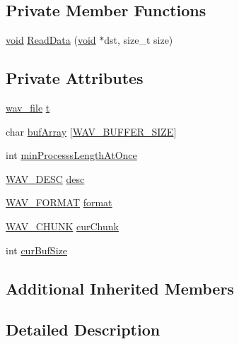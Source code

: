 \subsection*{Private Member Functions}
\begin{DoxyCompactItemize}
\item 
\mbox{\hyperlink{_thread_8h_af1e856da2e658414cb2456cb6f7ebc66}{void}} \mbox{\hyperlink{classnjli_1_1_wrapper_wav_a8e5df03af7dc8f841c9e316caa00a13d}{Read\+Data}} (\mbox{\hyperlink{_thread_8h_af1e856da2e658414cb2456cb6f7ebc66}{void}} $\ast$dst, size\+\_\+t size)
\end{DoxyCompactItemize}
\subsection*{Private Attributes}
\begin{DoxyCompactItemize}
\item 
\mbox{\hyperlink{structwav__file}{wav\+\_\+file}} \mbox{\hyperlink{classnjli_1_1_wrapper_wav_ad32ca04f4229e8b702a427dca72b9957}{t}}
\item 
char \mbox{\hyperlink{classnjli_1_1_wrapper_wav_a9b66f4b65280f952349f526c7012e9b8}{buf\+Array}} \mbox{[}\mbox{\hyperlink{_wrapper___w_a_v_8h_a9a6da6d572cf36f4c8df9df32f289291}{W\+A\+V\+\_\+\+B\+U\+F\+F\+E\+R\+\_\+\+S\+I\+ZE}}\mbox{]}
\item 
int \mbox{\hyperlink{classnjli_1_1_wrapper_wav_a89b4f2b0d96ed110de07c17f395b40b7}{min\+Processs\+Length\+At\+Once}}
\item 
\mbox{\hyperlink{struct_w_a_v___d_e_s_c}{W\+A\+V\+\_\+\+D\+E\+SC}} \mbox{\hyperlink{classnjli_1_1_wrapper_wav_abcaa318c09e942ca3a3bad1e34187d46}{desc}}
\item 
\mbox{\hyperlink{struct_w_a_v___f_o_r_m_a_t}{W\+A\+V\+\_\+\+F\+O\+R\+M\+AT}} \mbox{\hyperlink{classnjli_1_1_wrapper_wav_a7ae72bc3d456ddcf99ed6e78d05c6ca7}{format}}
\item 
\mbox{\hyperlink{struct_w_a_v___c_h_u_n_k}{W\+A\+V\+\_\+\+C\+H\+U\+NK}} \mbox{\hyperlink{classnjli_1_1_wrapper_wav_af0615f38310011eed743fbeab3356f86}{cur\+Chunk}}
\item 
int \mbox{\hyperlink{classnjli_1_1_wrapper_wav_a4915a4654f047eedb569dbe03b73f1f6}{cur\+Buf\+Size}}
\end{DoxyCompactItemize}
\subsection*{Additional Inherited Members}


\subsection{Detailed Description}


